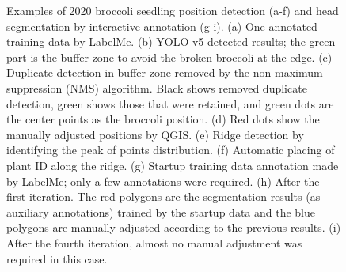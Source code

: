 \begin{figure}[htb]
  \begin{center}
  \end{center}
  \caption[Examples of 2020 broccoli seedling position detection and head segmentation by interactive annotation]{
    Examples of 2020 broccoli seedling position detection (a-f) and head segmentation by interactive annotation (g-i). 
    (a) One annotated training data by LabelMe. 
    (b) YOLO v5 detected results; the green part is the buffer zone to avoid the broken broccoli at the edge. 
    (c) Duplicate detection in buffer zone removed by the non-maximum suppression (NMS) algorithm. Black shows removed duplicate detection, green shows those that were retained, and green dots are the center points as the broccoli position. 
    (d) Red dots show the manually adjusted positions by QGIS. 
    (e) Ridge detection by identifying the peak of points distribution. 
    (f) Automatic placing of plant ID along the ridge. 
    (g) Startup training data annotation made by LabelMe; only a few annotations were required. 
    (h) After the first iteration. The red polygons are the segmentation results (as auxiliary annotations) trained by the startup data and the blue polygons are manually adjusted according to the previous results. 
    (i) After the fourth iteration, almost no manual adjustment was required in this case.
  }
  \label{fig:bros1}
\end{figure}